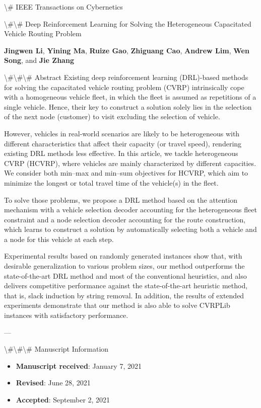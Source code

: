 \documentclass{article}
\begin{document}
	
	\textbackslash{}# IEEE Transactions on Cybernetics
	
	\textbackslash{}#\textbackslash{}# Deep Reinforcement Learning for Solving the Heterogeneous Capacitated Vehicle Routing Problem
	
	\textbf{Jingwen Li}, \textbf{Yining Ma}, \textbf{Ruize Gao}, \textbf{Zhiguang Cao}, \textbf{Andrew Lim}, \textbf{Wen Song}, and \textbf{Jie Zhang}
	
	\textbackslash{}#\textbackslash{}#\textbackslash{}# Abstract
	Existing deep reinforcement learning (DRL)-based methods for solving the capacitated vehicle routing problem (CVRP) intrinsically cope with a homogeneous vehicle fleet, in which the fleet is assumed as repetitions of a single vehicle. Hence, their key to construct a solution solely lies in the selection of the next node (customer) to visit excluding the selection of vehicle.
	
	However, vehicles in real-world scenarios are likely to be heterogeneous with different characteristics that affect their capacity (or travel speed), rendering existing DRL methods less effective. In this article, we tackle heterogeneous CVRP (HCVRP), where vehicles are mainly characterized by different capacities. We consider both min–max and min–sum objectives for HCVRP, which aim to minimize the longest or total travel time of the vehicle(s) in the fleet.
	
	To solve those problems, we propose a DRL method based on the attention mechanism with a vehicle selection decoder accounting for the heterogeneous fleet constraint and a node selection decoder accounting for the route construction, which learns to construct a solution by automatically selecting both a vehicle and a node for this vehicle at each step.
	
	Experimental results based on randomly generated instances show that, with desirable generalization to various problem sizes, our method outperforms the state-of-the-art DRL method and most of the conventional heuristics, and also delivers competitive performance against the state-of-the-art heuristic method, that is, slack induction by string removal. In addition, the results of extended experiments demonstrate that our method is also able to solve CVRPLib instances with satisfactory performance.
	
	---
	
	\textbackslash{}#\textbackslash{}#\textbackslash{}# Manuscript Information
	\begin{itemize}
		\item \textbf{Manuscript received}: January 7, 2021  
		\item \textbf{Revised}: June 28, 2021  
		\item \textbf{Accepted}: September 2, 2021  
	\end{itemize}
	
\end{document}
